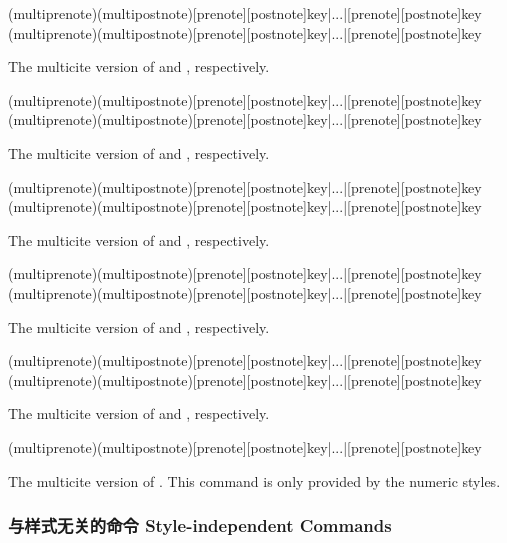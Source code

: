 \begin{ltxsyntax}

(multiprenote)(multipostnote)[prenote][postnote]{key}|...|[prenote][postnote]{key}
(multiprenote)(multipostnote)[prenote][postnote]{key}|...|[prenote][postnote]{key}

The multicite version of  and , respectively.

(multiprenote)(multipostnote)[prenote][postnote]{key}|...|[prenote][postnote]{key}
(multiprenote)(multipostnote)[prenote][postnote]{key}|...|[prenote][postnote]{key}

The multicite version of  and , respectively.

(multiprenote)(multipostnote)[prenote][postnote]{key}|...|[prenote][postnote]{key}
(multiprenote)(multipostnote)[prenote][postnote]{key}|...|[prenote][postnote]{key}

The multicite version of  and , respectively.

(multiprenote)(multipostnote)[prenote][postnote]{key}|...|[prenote][postnote]{key}
(multiprenote)(multipostnote)[prenote][postnote]{key}|...|[prenote][postnote]{key}

The multicite version of  and , respectively.

(multiprenote)(multipostnote)[prenote][postnote]{key}|...|[prenote][postnote]{key}
(multiprenote)(multipostnote)[prenote][postnote]{key}|...|[prenote][postnote]{key}

The multicite version of  and , respectively.

(multiprenote)(multipostnote)[prenote][postnote]{key}|...|[prenote][postnote]{key}

The multicite version of . This command is only provided by the numeric styles.

\end{ltxsyntax}

\subsubsection{与样式无关的命令 Style-independent Commands}
\label{use:cit:aut}

